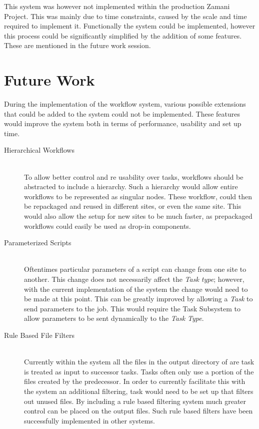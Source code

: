 This system was however not implemented within the production Zamani Project. This was
mainly due to time constraints, caused by the scale and time required to
implement it. Functionally the system could be implemented, however this process
could be significantly simplified by the addition of some features. These are
mentioned in the future work session.


\section{Future Work}
During the implementation of the workflow system, various possible extensions
that could be added to the system could
not be implemented. These features would improve the system both in terms of
performance,
usability and set up time.
\begin{description}
\item[Hierarchical Workflows]\hfill \\
To allow better control and re usability over tasks, workflows should be
abstracted to include a hierarchy. Such a hierarchy would allow entire workflows
to be represented as singular nodes. These workflow, could then be repackaged
and reused in different sites, or even the same site. This would also allow the
setup for new sites to be much faster, as prepackaged workflows could easily be
used as drop-in components.
\item[Parameterized Scripts]\hfill \\
Oftentimes particular parameters of a script can change from one site to
another. This change does not necessarily affect the \emph{Task type}; however,
with the current implementation of the system the change would need to be made
at this point. This can be greatly improved by allowing a \emph{Task} to send
parameters to the job. This would require the Task Subsystem to allow parameters to
be sent dynamically to the \emph{Task Type}.
\item[Rule Based File Filters]\hfill \\
Currently within the system all the files in the output directory of are task is
treated as input to successor tasks. Tasks often only use a portion of the
files created by the predecessor. In order to currently facilitate this with the
system an additional filtering, task would need to be set up that filters out
unused files. By including a rule based filtering system much greater control
can be placed on the output files. Such rule based filters have been
successfully implemented in other systems\cite{conery2005rule}.

\end{description}
